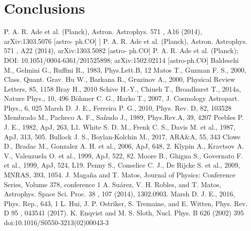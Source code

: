 \documentclass[amssymb,twocolumn,prd,nofootinbib,showpacs]{revtex4-1}
\begin{document}
\section{Conclusions}\label{conclusions}

\appendix


\begin{thebibliography}{9}
  P. A. R. Ade
et al.
(Planck), Astron. Astrophys.
571
, A16 (2014), arXiv:1303.5076 [astro-
ph.CO]
 ]  P. A. R. Ade
et al.
(Planck), Astron. Astrophys.
571
, A22 (2014), arXiv:1303.5082 [astro-
ph.CO]
 P. A. R. Ade et al. (Planck); DOI: 	10.1051/0004-6361/201525898;  	arXiv:1502.02114 [astro-ph.CO]
 Baldeschi M., Gelmini G., Ruffini R., 1983, Phys.Lett.B, 12
 Matos T., Guzman F. S., 2000, Class. Quant. Grav. 
 Hu W., Barkana R., Gruzinov A., 2000, Physical Review Letters, 85, 1158
Bray H., 2010
Schive H.-Y., Chiueh T., Broadhurst T., 2014a, Nature Phys., 10, 496
B\"ohmer C. G., Harko T., 2007, J. Cosmology Astropart. Phys., 6, 025
Marsh D. J. E., Ferreira P. G., 2010, Phys. Rev. D, 82, 103528
 Membrado M., Pacheco A. F., Sa\~nudo J., 1989, Phys.Rev.A, 39, 4207
Peebles P. J. E., 1982, ApJ, 263, L1.
White S. D. M., Frenk C. S., Davis M. et al., 1987, ApJ, 313, 505.
Bullock J. S., Boylan-Kolchin M., 2017, ARA$\&$A, 55, 343
Clowe D., Bradac M., Gonzalez A. H. et al., 2006, ApJ, 648, 2.
Klypin A., Kravtsov A. V., Valenzuela O. et al., 1999, ApJ, 522, 82.
Moore B., Ghigna S., Governato F. et al., 1999, ApJ, 524, L19.
Penny S., Conselice C. J., De Rijcke S. et al., 2009, MNRAS, 393, 1054.
 J. Maga\~na and T. Matos,  Journal of Physics: Conference Series, Volume 378, conference 1
  A. Su\'arez, V. H. Robles, and T. Matos, Astrophys. Space
Sci. Proc.
38
, 107 (2014), 1302.0903.
 Marsh D. J. E., 2016, Phys. Rep., 643, 1
  L. Hui, J. P. Ostriker, S. Tremaine, and E. Witten, Phys. Rev. D
95
, 043541 (2017).
K. Enqvist and M. S. Sloth, Nucl. Phys. B
626
(2002) 395 doi:10.1016/S0550-3213(02)00043-3

\end{thebibliography}
\end{document}
